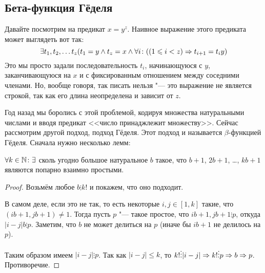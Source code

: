 \subsection{Бета-функция Гёделя}

Давайте посмотрим на предикат $x=y^z$.
Наивное выражение этого предиката может выглядеть вот так:
\[ \exists t_1, t_2, \dots t_z (t_1 = y \land t_z = x \land \forall i \colon ((1 \leqslant i < z) \Rightarrow t_{i+1}=t_iy) \]
Это мы просто задали последовательность $t_i$, начинающуюся с $y$, заканчивающуюся на $x$ и
с фиксированным отношением между соседними членами.
Но, вообще говоря, так писать нельзя "--- это выражение не является строкой, так как его длина неопределена
и зависит от $z$.

Год назад мы боролись с этой проблемой, кодируя множества натуральными числами и вводя
предикат <<число принаджлежит множеству>>.
Сейчас рассмотрим другой подход, подход Гёделя.
Этот подход и называется $\beta$-функцией Гёделя.
Сначала нужно несколько лемм:

\begin{lemma}\label{bigCoprimeSeq}
	$\forall k \in \mathbb{N} \colon \exists$ сколь угодно большое натуральное $b$ такое,
	что $b+1$, $2b+1$, \dots, $kb+1$ являются попарно взаимно простыми.
\end{lemma}
\begin{proof}
	Возьмём любое $b \vdots k!$ и покажем, что оно подходит.

	В самом деле, если это не так, то есть некоторые $i, j \in [1, k]$ такие, что $(ib+1, jb+1)\ne 1$.
	Тогда пусть $p$ "--- такое простое, что $ib+1, jb+1 \vdots p$, откуда $|i-j|b \vdots p$.
	Заметим, что $b$ не может делиться на $p$ (иначе бы $ib+1$ не делилось на $p$).

	Таким образом имеем $|i-j| \vdots p$.
	Так как $|i-j|\le k$, то $k! \vdots |i-j| \Rightarrow k! \vdots p \Rightarrow b \Rightarrow p$.
	Противоречие.
\end{proof}

